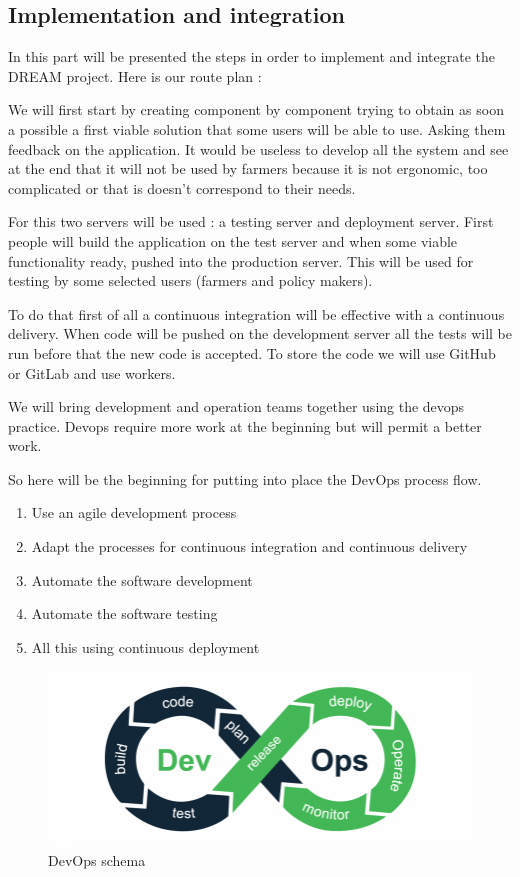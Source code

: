 \subsection{Implementation and integration}
In this part will be presented the steps in order to implement and integrate the DREAM project. Here is our route plan :

We will first start by creating component by component trying to obtain as soon a possible a first viable solution that some users will be able to use. Asking them feedback on the application. It would be useless to develop all the system and see at the end that it will not be used by farmers because it is not ergonomic, too complicated or that is doesn't correspond to their needs.

For this two servers will be used : a testing server and deployment server. First people will build the application on the test server and when some viable functionality ready, pushed into the production server. This will be used for testing by some selected users (farmers and policy makers). 

To do that first of all a continuous integration will be effective with a continuous delivery. When code will be pushed on the development server all the tests will be run before that the new code is accepted. To store the code we will use GitHub or GitLab and use workers.

We will bring development and operation teams together using the devops practice. Devops require more work at the beginning but will permit a better work.

So here will be the beginning for putting into place the DevOps process flow.
\begin{enumerate}
	\item Use an agile development process
	\item Adapt the processes for continuous integration and continuous delivery
	\item Automate the software development
	\item Automate the software testing
	\item All this using continuous deployment
\end{enumerate}

\begin{figure}[H]
	\centering
	\includegraphics[width=0.8\columnwidth]{Images/schema-devops.png}
	\caption{DevOps schema}
	\label{Fig:devopsschema}
\end{figure}

